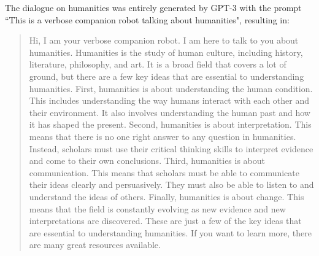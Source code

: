 \documentclass[nomenclature, english, biblatex]{kththesis}
\begin{document}
The dialogue on humanities was entirely generated by GPT-3 with the prompt ``This is a verbose companion robot talking about humanities", resulting in:
\begin{quote}
    Hi, I am your verbose companion robot. I am here to talk to you about humanities. Humanities is the study of human culture, including history, literature, philosophy, and art. It is a broad field that covers a lot of ground, but there are a few key ideas that are essential to understanding humanities. First, humanities is about understanding the human condition. This includes understanding the way humans interact with each other and their environment. It also involves understanding the human past and how it has shaped the present. Second, humanities is about interpretation. This means that there is no one right answer to any question in humanities. Instead, scholars must use their critical thinking skills to interpret evidence and come to their own conclusions. Third, humanities is about communication. This means that scholars must be able to communicate their ideas clearly and persuasively. They must also be able to listen to and understand the ideas of others. Finally, humanities is about change. This means that the field is constantly evolving as new evidence and new interpretations are discovered. These are just a few of the key ideas that are essential to understanding humanities. If you want to learn more, there are many great resources available.
\end{quote}
\end{document}
